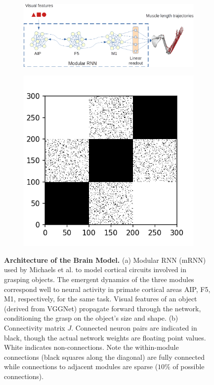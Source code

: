\documentclass[12pt]{iopart}
\begin{document}
\begin{figure}
	\centering
	\begin{subfigure}[c]{0.69\textwidth}
		\centering
		\includegraphics[width=\textwidth]{michaels.png}
		\caption{}
	\end{subfigure}
	\hfill
	\begin{subfigure}[c]{0.30\textwidth}
		\centering
		\includegraphics[width=\textwidth]{mRNN_J.png}
		\caption{}
	\end{subfigure}
	\hfill
\caption{\textbf{Architecture of the Brain Model.} (a) Modular RNN (mRNN) used by Michaels et al.
        \cite{michaels.mrnn} to model cortical circuits involved in grasping objects.
        The emergent dynamics of the three modules correspond well to neural activity in
        primate cortical areas AIP, F5, M1, respectively, for the same task. Visual
        features of an object (derived from VGGNet) propagate forward through the
		network, conditioning the grasp on the object's size and shape. (b)
		Connectivity matrix $J$. Connected neuron pairs are indicated in black, though the
		actual network weights are floating point values. White indicates non-connections.
		Note the within-module connections (black squares along	the diagonal) are fully
		connected while connections to adjacent modules are sparse
		($10\%$ of possible connections).}
\label{fig:michaels}
\end{figure}
\end{document}

